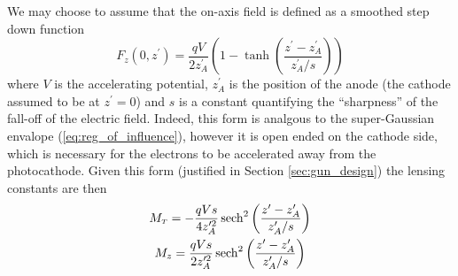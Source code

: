 We may choose to assume that the on-axis field is defined as a smoothed step down function
\begin{equation}
  F_z(0,z^{\prime}) = \frac{qV}{2z^{\prime}_A} \left( 1 - \tanh \left( \frac{ z^{\prime} - z^{\prime}_A }{ z^{\prime}_A / s } \right) \right)
\end{equation}
where $V$ is the accelerating potential, $z^{\prime}_A$ is the position of the anode (the cathode assumed to be at $z^{\prime} = 0$) and $s$ is a constant quantifying the ``sharpness'' of the fall-off of the electric field.
Indeed, this form is analgous to the super-Gaussian envalope (\ref{eq:reg_of_influence}), however it is open ended on the cathode side, which is necessary for the electrons to be accelerated away from the photocathode.
Given this form (justified in Section \ref{sec:gun_design}) the lensing constants are then
\begin{gather}
  M_{{\scriptscriptstyle T}} = -\frac{qVs}{4z^{\prime 2}_A} \operatorname{sech}^2 \left( \frac{z^{\prime} - z^{\prime}_A }{ z^{\prime}_A / s } \right) \\
  M_z = \frac{qVs}{2z^{\prime 2}_A} \operatorname{sech}^2 \left( \frac{z^{\prime} - z^{\prime}_A }{ z^{\prime}_A / s } \right)
\end{gather}
